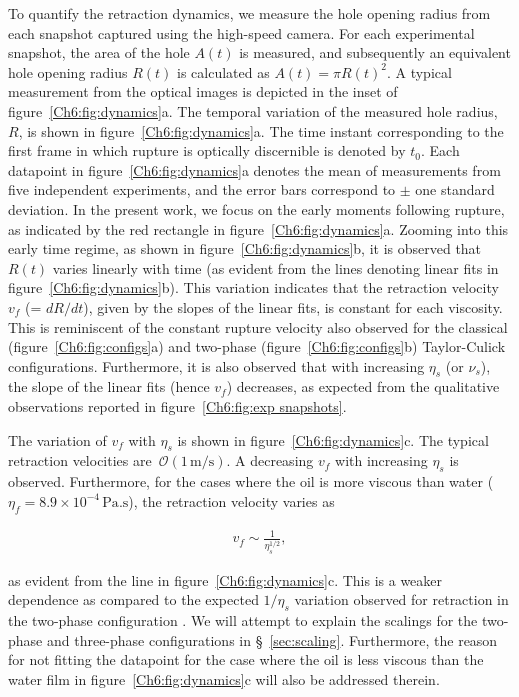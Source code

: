 To quantify the retraction dynamics, we measure the hole opening radius from each snapshot captured using the high-speed camera. For each experimental snapshot, the area of the hole $A(t)$ is measured, and subsequently an equivalent hole opening radius $R(t)$ is calculated as $A(t) = \pi R(t)^{2}$. A typical measurement from the optical images is depicted in the inset of figure~\ref{Ch6:fig:dynamics}a. The temporal variation of the measured hole radius, $R$, is shown in figure~\ref{Ch6:fig:dynamics}a. The time instant corresponding to the first frame in which rupture is optically discernible is denoted by $t_{0}$. Each datapoint in figure~\ref{Ch6:fig:dynamics}a denotes the mean of measurements from five independent experiments, and the error bars correspond to $\pm$ one standard deviation. In the present work, we focus on the early moments following rupture, as indicated by the red rectangle in figure~\ref{Ch6:fig:dynamics}a. Zooming into this early time regime, as shown in figure~\ref{Ch6:fig:dynamics}b, it is observed that $R(t)$ varies linearly with time (as evident from the lines denoting linear fits in figure~\ref{Ch6:fig:dynamics}b). This variation indicates that the retraction velocity $v_f$ (= $dR/dt$), given by the slopes of the linear fits, is constant for each viscosity. This is reminiscent of the constant rupture velocity also observed for the classical (figure~\ref{Ch6:fig:configs}a) and two-phase (figure~\ref{Ch6:fig:configs}b) Taylor-Culick configurations. Furthermore, it is also observed that with increasing $\eta_{s}$ (or $\nu_{s}$), the slope of the linear fits (hence $v_f$) decreases, as expected from the qualitative observations reported in figure~\ref{Ch6:fig:exp snapshots}. 

The variation of $v_f$ with $\eta_{s}$ is shown in figure~\ref{Ch6:fig:dynamics}c. The typical retraction velocities are~$\mathcal{O}\left(1\,\si{\meter}/\si{\second}\right)$. A decreasing $v_f$ with increasing $\eta_{s}$ is observed. Furthermore, for the cases where the oil is more viscous than water ($\eta_{f} = 8.9 \times 10^{-4}\,\si{\pascal}.\si{\second}$), the retraction velocity varies as

\begin{align}
	v_{f} \sim \frac{1}{\eta_{s}^{1/2}}, 
	\label{Ch6:eq:exp scaling}
\end{align}

\noindent as evident from the line in figure~\ref{Ch6:fig:dynamics}c. This is a weaker dependence as compared to the expected $1/\eta_{s}$ variation observed for retraction in the two-phase configuration \citep{martin-1994-epl, eri-2010-pre}. We will attempt to explain the scalings for the two-phase and three-phase configurations in \S~\ref{sec:scaling}. Furthermore, the reason for not fitting the datapoint for the case where the oil is less viscous than the water film in figure~\ref{Ch6:fig:dynamics}c will also be addressed therein. 

